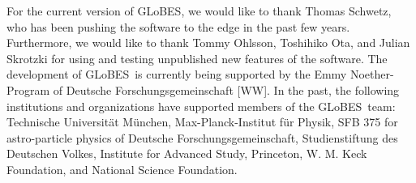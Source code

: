 \documentclass[12pt,a4paper]{article}
\newcommand{\GLOBES}{{\sf GLoBES}}
\begin{document}
For the current version of \GLOBES , we would like to 
thank Thomas Schwetz, who has been pushing the software to the edge in the 
past few years. Furthermore, we would like to thank Tommy Ohlsson,
Toshihiko Ota, and Julian Skrotzki for using and testing unpublished new features of the software.
%
The development of \GLOBES\ is currently being supported by the
Emmy Noether-Program of Deutsche Forschungsgemeinschaft [WW].
%
In the past, the following institutions and organizations have supported 
members of the \GLOBES\ team: Technische Universit\"at M\"unchen,
Max-Planck-Institut f\"ur Physik, SFB 375 for astro-particle physics
of Deutsche Forschungsgemeinschaft, Studienstiftung des Deutschen Volkes,
Institute for Advanced Study, Princeton, W. M. Keck Foundation, and National Science Foundation.



\end{document}
